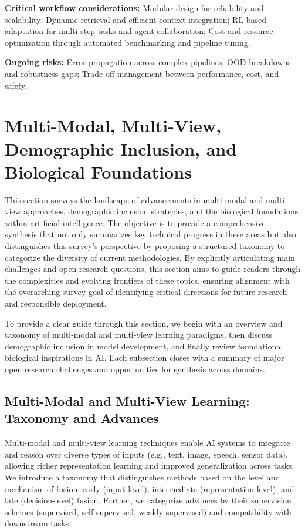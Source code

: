 \documentclass[sigconf]{acmart}
\begin{document}
\textbf{Critical workflow considerations:}
Modular design for reliability and scalability;
Dynamic retrieval and efficient context integration;
RL-based adaptation for multi-step tasks and agent collaboration;
Cost and resource optimization through automated benchmarking and pipeline tuning.

\textbf{Ongoing risks:}
Error propagation across complex pipelines;
OOD breakdowns and robustness gaps;
Trade-off management between performance, cost, and safety.

\section{Multi-Modal, Multi-View, Demographic Inclusion, and Biological Foundations}

This section surveys the landscape of advancements in multi-modal and multi-view approaches, demographic inclusion strategies, and the biological foundations within artificial intelligence. The objective is to provide a comprehensive synthesis that not only summarizes key technical progress in these areas but also distinguishes this survey's perspective by proposing a structured taxonomy to categorize the diversity of current methodologies. By explicitly articulating main challenges and open research questions, this section aims to guide readers through the complexities and evolving frontiers of these topics, ensuring alignment with the overarching survey goal of identifying critical directions for future research and responsible deployment.

To provide a clear guide through this section, we begin with an overview and taxonomy of multi-modal and multi-view learning paradigms, then discuss demographic inclusion in model development, and finally review foundational biological inspirations in AI. Each subsection closes with a summary of major open research challenges and opportunities for synthesis across domains.

\subsection{Multi-Modal and Multi-View Learning: Taxonomy and Advances}

Multi-modal and multi-view learning techniques enable AI systems to integrate and reason over diverse types of inputs (e.g., text, image, speech, sensor data), allowing richer representation learning and improved generalization across tasks. We introduce a taxonomy that distinguishes methods based on the level and mechanism of fusion: early (input-level), intermediate (representation-level), and late (decision-level) fusion. Further, we categorize advances by their supervision schemes (supervised, self-supervised, weakly supervised) and compatibility with downstream tasks.
\end{document}
